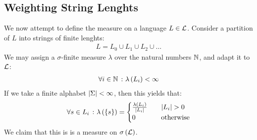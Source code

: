 \subsection{Weighting String Lenghts}
We now attempt to define the measure on a language \(L \in \mathcal{L}\).
Consider a partition of \(L\) into strings of finite lenghts:
\begin{align*}
  L = L_0 \cup L_1 \cup L_2 \cup \ldots
\end{align*}
We may assign a \(\sigma\)-finite
measure \(\lambda\) over the natural numbers \(\mathbb{N}\),
and adapt it to \(\mathcal{L}\):
\begin{align*}
  \forall i \in \mathbb{N} \ \colon \lambda\left(L_i\right) < \infty
\end{align*}
If we take a finite alphabet \(\left\lvert\Sigma\right\rvert < \infty\), then this yields that:
\begin{align*}
  \forall s \in L_i \ \colon
    \lambda \left(\left\{s\right\}\right)
      =
      \begin{cases}
        \frac{\lambda\left(L_i\right)}{\left\lvert L_i\right\rvert}
          & \quad \left\lvert L_i\right\rvert > 0 \\
        0 & \quad \text{otherwise}
      \end{cases}
\end{align*}
We claim that this is is a measure on \(\sigma\left(\mathcal{L}\right)\).



